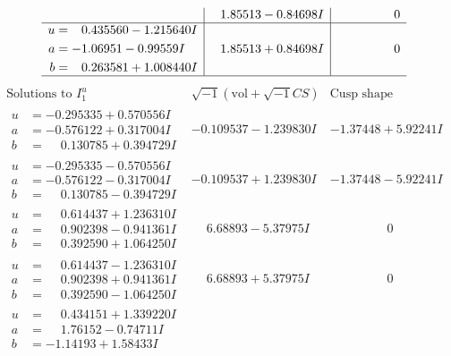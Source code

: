 \documentclass[1p]{elsarticle_modified}
\theoremstyle{definition}
\newcommand{\I}{\sqrt{-1}}
\begin{document}
$$\begin{array}{c|c|c}
 & \phantom{-}1.85513 - 0.84698 I & \phantom{-0.000000 } 0 \\ \hline\begin{aligned}
u &= \phantom{-}0.435560 - 1.215640 I \\
a &= -1.06951 - 0.99559 I \\
b &= \phantom{-}0.263581 + 1.008440 I\end{aligned}
 & \phantom{-}1.85513 + 0.84698 I & \phantom{-0.000000 } 0\\
 \hline 
 \end{array}$$\newpage$$\begin{array}{c|c|c}  
\text{Solutions to }I^u_{1}& \I (\text{vol} + \sqrt{-1}CS) & \text{Cusp shape}\\
 \hline 
\begin{aligned}
u &= -0.295335 + 0.570556 I \\
a &= -0.576122 + 0.317004 I \\
b &= \phantom{-}0.130785 + 0.394729 I\end{aligned}
 & -0.109537 - 1.239830 I & -1.37448 + 5.92241 I \\ \hline\begin{aligned}
u &= -0.295335 - 0.570556 I \\
a &= -0.576122 - 0.317004 I \\
b &= \phantom{-}0.130785 - 0.394729 I\end{aligned}
 & -0.109537 + 1.239830 I & -1.37448 - 5.92241 I \\ \hline\begin{aligned}
u &= \phantom{-}0.614437 + 1.236310 I \\
a &= \phantom{-}0.902398 - 0.941361 I \\
b &= \phantom{-}0.392590 + 1.064250 I\end{aligned}
 & \phantom{-}6.68893 - 5.37975 I & \phantom{-0.000000 } 0 \\ \hline\begin{aligned}
u &= \phantom{-}0.614437 - 1.236310 I \\
a &= \phantom{-}0.902398 + 0.941361 I \\
b &= \phantom{-}0.392590 - 1.064250 I\end{aligned}
 & \phantom{-}6.68893 + 5.37975 I & \phantom{-0.000000 } 0 \\ \hline\begin{aligned}
u &= \phantom{-}0.434151 + 1.339220 I \\
a &= \phantom{-}1.76152 - 0.74711 I \\
b &= -1.14193 + 1.58433 I\end{aligned}

\end{array}$$
\end{document}
